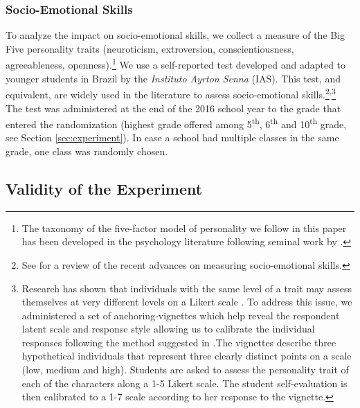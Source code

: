 \documentclass[11pt,a4paper]{article}
\begin{document}
\subsubsection*{Socio-Emotional Skills} 
To analyze the impact on socio-emotional skills, we collect a measure of the Big Five personality traits (neuroticism, extroversion, conscientiousness, agreeableness, openness).\footnote{The taxonomy of the five-factor model of personality we follow in this paper has been developed in the psychology literature following seminal work by \citet{fiske1949consistency}.} We use a self-reported test developed and adapted to younger students in Brazil by the \textit{Instituto Ayrton Senna} (IAS). This test, and equivalent, are widely used in the literature to assess socio-emotional skills.\footnote{See \cite{kautz2014fostering} for a review of the recent advances on measuring socio-emotional skills.}\textsuperscript{,}\footnote{Research has shown that individuals with the same level of a trait may assess themselves at very different levels on a Likert scale \citep{primi2016anchor}. To address this issue, we administered a set of anchoring-vignettes which help reveal the respondent latent scale and response style allowing us to calibrate the individual responses following the method suggested in \cite{primi2016anchor}.The vignettes describe three hypothetical individuals that represent three clearly distinct points on a scale (low, medium and high). Students are asked to assess the personality trait of each of the characters along a 1-5 Likert scale. The student self-evaluation is then calibrated to a 1-7 scale according to her response to the vignette.} The test was administered at the end of the 2016 school year to the grade that entered the randomization (highest grade offered among 5\textsuperscript{th}, 6\textsuperscript{th} and 10\textsuperscript{th} grade, see Section \ref{sec:experiment}). In case a school had multiple classes in the same grade, one class was randomly chosen.  


\subsection{Validity of the Experiment} \label{sec:balance}
\end{document}
